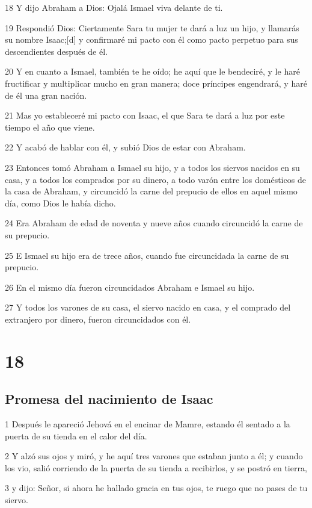 18 Y dijo Abraham a Dios: Ojalá Ismael viva delante de ti.

19 Respondió Dios: Ciertamente Sara tu mujer te dará a luz un hijo, y llamarás su nombre Isaac;[d] y confirmaré mi pacto con él como pacto perpetuo para sus descendientes después de él.

20 Y en cuanto a Ismael, también te he oído; he aquí que le bendeciré, y le haré fructificar y multiplicar mucho en gran manera; doce príncipes engendrará, y haré de él una gran nación.

21 Mas yo estableceré mi pacto con Isaac, el que Sara te dará a luz por este tiempo el año que viene.

22 Y acabó de hablar con él, y subió Dios de estar con Abraham.

23 Entonces tomó Abraham a Ismael su hijo, y a todos los siervos nacidos en su casa, y a todos los comprados por su dinero, a todo varón entre los domésticos de la casa de Abraham, y circuncidó la carne del prepucio de ellos en aquel mismo día, como Dios le había dicho.

24 Era Abraham de edad de noventa y nueve años cuando circuncidó la carne de su prepucio.

25 E Ismael su hijo era de trece años, cuando fue circuncidada la carne de su prepucio.

26 En el mismo día fueron circuncidados Abraham e Ismael su hijo.

27 Y todos los varones de su casa, el siervo nacido en casa, y el comprado del extranjero por dinero, fueron circuncidados con él.

\chapter{18}

\section{Promesa del nacimiento de Isaac}

1 Después le apareció Jehová en el encinar de Mamre, estando él sentado a la puerta de su tienda en el calor del día.

2 Y alzó sus ojos y miró, y he aquí tres varones que estaban junto a él; y cuando los vio, salió corriendo de la puerta de su tienda a recibirlos, y se postró en tierra,

3 y dijo: Señor, si ahora he hallado gracia en tus ojos, te ruego que no pases de tu siervo.

